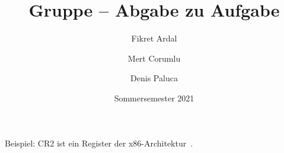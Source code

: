 \documentclass[course=erap]{aspdoc}
\author{Fikret Ardal \and Mert Corumlu \and Denis Paluca}
\date{Sommersemester 2021} %
\title{Gruppe \theGroup{} -- Abgabe zu Aufgabe \theNumber}
\begin{document}
\maketitle








Beispiel: CR2 ist ein Register der x86-Architektur~\cite{intel2017man}.

{}
\end{document}
